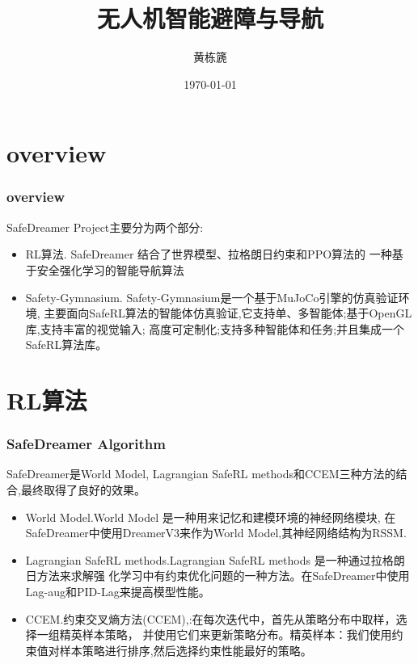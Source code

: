 \documentclass[10pt,mathserif]{beamer}%
\title{无人机智能避障与导航}
\institute[北京航空航天大学\\计算机学院]{北京航空航天大学计算机学院23级硕士研究
生} %
\author{黄栋篪}
\date{\today}%
\begin{document}
{\xdbg {}}%

\section{overview}

\begin{frame}[fragile]
	\frametitle{overview}
	\begin{spacing}{1.5}
		SafeDreamer Project主要分为两个部分:
		\begin{itemize}
			\item RL算法. SafeDreamer 结合了世界模型、拉格朗日约束和PPO算法的
			一种基于安全强化学习的智能导航算法
		\end{itemize}
		\begin{itemize}
			\item Safety-Gymnasium. Safety-Gymnasium是一个基于MuJoCo引擎的仿真验证环境,
			主要面向SafeRL算法的智能体仿真验证,它支持单、多智能体;基于OpenGL库,支持丰富的视觉输入;
			高度可定制化;支持多种智能体和任务;并且集成一个SafeRL算法库。
		\end{itemize}
	\end{spacing}
\end{frame}

\section{RL算法}
\begin{frame}[fragile]
	\frametitle{SafeDreamer Algorithm}
	\begin{spacing}{1.5}
		SafeDreamer是World Model, Lagrangian SafeRL methods和CCEM三种方法的结合,最终取得了良好的效果。
		\begin{itemize}
			\item World Model.World Model 是一种用来记忆和建模环境的神经网络模块,
			在SafeDreamer中使用DreamerV3来作为World Model,其神经网络结构为RSSM.
		\end{itemize}
		\begin{itemize}
			\item Lagrangian SafeRL methods.Lagrangian SafeRL methods 是一种通过拉格朗日方法来求解强
			化学习中有约束优化问题的一种方法。在SafeDreamer中使用Lag-aug和PID-Lag来提高模型性能。
		\end{itemize}
		\begin{itemize}
			\item CCEM.约束交叉熵方法(CCEM),:在每次迭代中，首先从策略分布中取样，选择一组精英样本策略，
			并使用它们来更新策略分布。精英样本：我们使用约束值对样本策略进行排序,然后选择约束性能最好的策略。
		\end{itemize}
	\end{spacing}
\end{frame}
\end{document}
